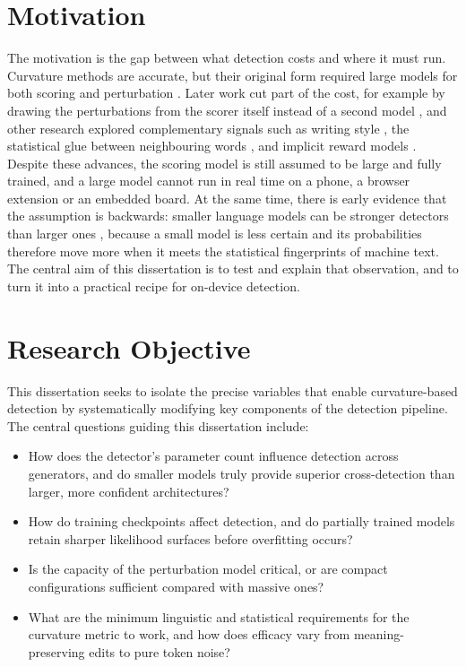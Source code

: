 \documentclass[logo,msc,cs]{infthesis}      %
\begin{document}
\section{Motivation}
\label{sec:motivation}
The motivation is the gap between what detection costs and where it must run. Curvature methods are accurate, but their original form required large models for both scoring and perturbation \citep{mitchell2023detectgpt}. Later work cut part of the cost, for example by drawing the perturbations from the scorer itself instead of a second model \citep{bao2024fast}, and other research explored complementary signals such as writing style \citep{breneur2026notai}, the statistical glue between neighbouring words \citep{ma2024zero}, and implicit reward models \citep{liu2026zero}. Despite these advances, the scoring model is still assumed to be large and fully trained, and a large model cannot run in real time on a phone, a browser extension or an embedded board.
At the same time, there is early evidence that the assumption is backwards: smaller language models can be stronger detectors than larger ones \citep{mireshghallah2023smaller}, because a small model is less certain and its probabilities therefore move more when it meets the statistical fingerprints of machine text. The central aim of this dissertation is to test and explain that observation, and to turn it into a practical recipe for on-device detection.

\section{Research Objective}
\label{sec:research_objective}
This dissertation seeks to isolate the precise variables that enable curvature-based detection by systematically modifying key components of the detection pipeline. The central questions guiding this dissertation include:
\begin{itemize}
\item How does the detector's parameter count influence detection across generators, and do smaller models truly provide superior cross-detection than larger, more confident architectures?
\item How do training checkpoints affect detection, and do partially trained models retain sharper likelihood surfaces before overfitting occurs?
\item Is the capacity of the perturbation model critical, or are compact configurations sufficient compared with massive ones?
\item What are the minimum linguistic and statistical requirements for the curvature metric to work, and how does efficacy vary from meaning-preserving edits to pure token noise?
\end{itemize}
\end{document}
